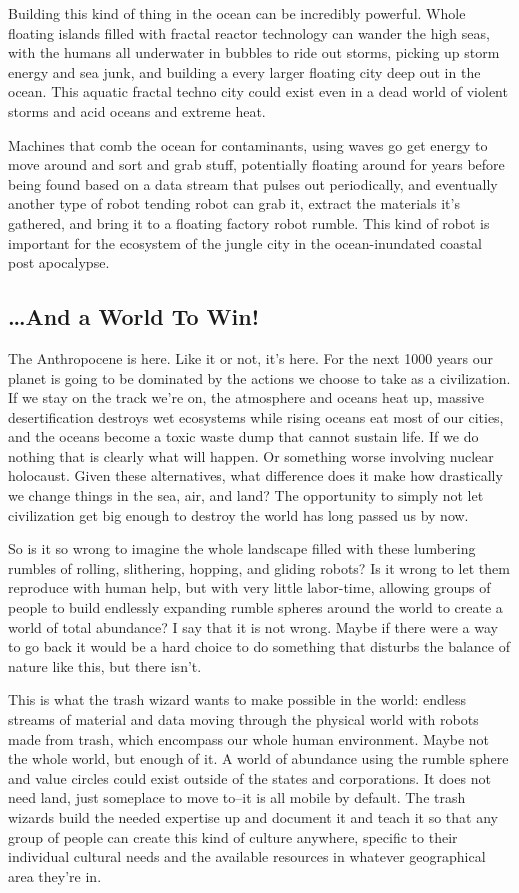 Building this kind of thing in the ocean can be incredibly powerful.
Whole floating islands filled with fractal reactor technology can wander
the high seas, with the humans all underwater in bubbles to ride out
storms, picking up storm energy and sea junk, and building a every
larger floating city deep out in the ocean. This aquatic fractal techno
city could exist even in a dead world of violent storms and acid oceans
and extreme heat.

Machines that comb the ocean for contaminants, using waves go get energy
to move around and sort and grab stuff, potentially floating around for
years before being found based on a data stream that pulses out
periodically, and eventually another type of robot tending robot can
grab it, extract the materials it's gathered, and bring it to a floating
factory robot rumble. This kind of robot is important for the ecosystem
of the jungle city in the ocean-inundated coastal post apocalypse.

\subsection{\ldots{}And a World To Win!}\label{and-a-world-to-win}

The Anthropocene is here. Like it or not, it's here. For the next 1000
years our planet is going to be dominated by the actions we choose to
take as a civilization. If we stay on the track we're on, the atmosphere
and oceans heat up, massive desertification destroys wet ecosystems
while rising oceans eat most of our cities, and the oceans become a
toxic waste dump that cannot sustain life. If we do nothing that is
clearly what will happen. Or something worse involving nuclear
holocaust. Given these alternatives, what difference does it make how
drastically we change things in the sea, air, and land? The opportunity
to simply not let civilization get big enough to destroy the world has
long passed us by now.

So is it so wrong to imagine the whole landscape filled with these
lumbering rumbles of rolling, slithering, hopping, and gliding robots?
Is it wrong to let them reproduce with human help, but with very little
labor-time, allowing groups of people to build endlessly expanding
rumble spheres around the world to create a world of total abundance? I
say that it is not wrong. Maybe if there were a way to go back it would
be a hard choice to do something that disturbs the balance of nature
like this, but there isn't.

This is what the trash wizard wants to make possible in the world:
endless streams of material and data moving through the physical world
with robots made from trash, which encompass our whole human
environment. Maybe not the whole world, but enough of it. A world of
abundance using the rumble sphere and value circles could exist outside
of the states and corporations. It does not need land, just someplace to
move to--it is all mobile by default. The trash wizards build the needed
expertise up and document it and teach it so that any group of people
can create this kind of culture anywhere, specific to their individual
cultural needs and the available resources in whatever geographical area
they're in.
